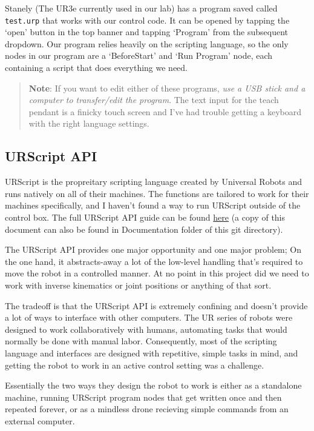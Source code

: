 \documentclass[11pt]{article}
\begin{document}
Stanely (The UR3e currently used in our lab) has a program saved called \texttt{test.urp} that works with our control code.
It can be opened by tapping the `open' button in the top banner and tapping `Program' from the subsequent dropdown. 
Our program relies heavily on the scripting language, so the only nodes in our program are a `BeforeStart' and `Run Program' node, each containing a script that does everything we need.
\begin{quote}
\textbf{Note}: If you want to edit either of these programs, \textit{use a USB stick and a computer to transfer/edit the program}. The text input for the teach pendant is a finicky touch screen and I've had trouble getting a keyboard with the right language settings.
\end{quote}

\subsection{URScript API}\label{sec:urscript}
URScript is the propreitary scripting language created by Universal Robots and runs natively on all of their machines. The functions are tailored to work for their machines specifically, and I haven't found a way to run URScript outside of the control box.
The full URScript API guide can be found \href{https://s3-eu-west-1.amazonaws.com/ur-support-site/32554/scriptManual-3.5.4.pdf}{here} (a copy of this document can also be found in Documentation folder of this git directory).

The URScript API provides one major opportunity and one major problem; On the one hand, it abstracts-away a lot of the low-level handling that's required to move the robot in a controlled manner. At no point in this project did we need to work with inverse kinematics or joint positions or anything of that sort.

The tradeoff is that the URScript API is extremely confining and doesn't provide a lot of ways to interface with other computers. The UR series of robots were designed to work collaboratively with humans, automating tasks that would normally be done with manual labor. Consequently, most of the scripting language and interfaces are designed with repetitive, simple tasks in mind, and getting the robot to work in an active control setting was a challenge.

Essentially the two ways they design the robot to work is either as a standalone machine, running URScript program nodes that get written once and then repeated forever, or as a mindless drone recieving simple commands from an external computer.
\end{document}
